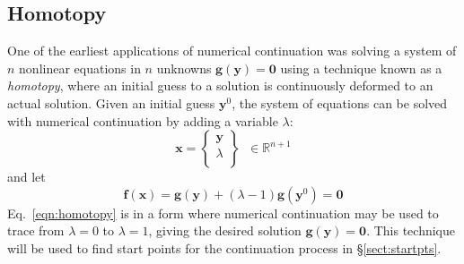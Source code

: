 \documentclass[11pt,openany,twoside]{book}
\numberwithin{equation}{section}		%
\newcommand{\Newterm}[1]{{\em #1}}
\newcommand{\Vector}[1]{\boldsymbol{#1}}
\newcommand{\Sectref}[1]{\S\ref{#1}}
\newcommand{\Eqn}[1]{Eq.\ \ref{#1}}  %
\begin{document}
\subsection{Homotopy}\label{sect:homotopy}
One of the earliest applications of numerical continuation was solving a system
of $n$ nonlinear equations in $n$ unknowns
$\Vector{g}(\Vector{y})=\Vector{0}$ using a
technique known as a \Newterm{homotopy},
where an initial guess to a solution is continuously deformed to an actual solution.
Given an initial guess $\Vector{y}^0$,
the system of equations can be solved with numerical continuation by adding
a variable $\lambda$:
\begin{equation}
\Vector{x} = \left\{\begin{array}{c}
\Vector{y} \\
\lambda \\
\end{array} \right\} \;\; \in \mathbb{R}^{n+1}
\end{equation}
and let
\begin{equation}\label{eqn:homotopy}
\Vector{f}(\Vector{x}) = \Vector{g}(\Vector{y})
	+ (\lambda - 1)\Vector{g}(\Vector{y}^0) = \Vector{0}
\end{equation}
\Eqn{eqn:homotopy} is in a form where numerical continuation may be used to
trace from $\lambda=0$ to $\lambda=1$, giving the desired solution
$\Vector{g}(\Vector{y}) = \Vector{0}$.
This technique will be used to find start points for the continuation process
in \Sectref{sect:startpts}.
\end{document}
